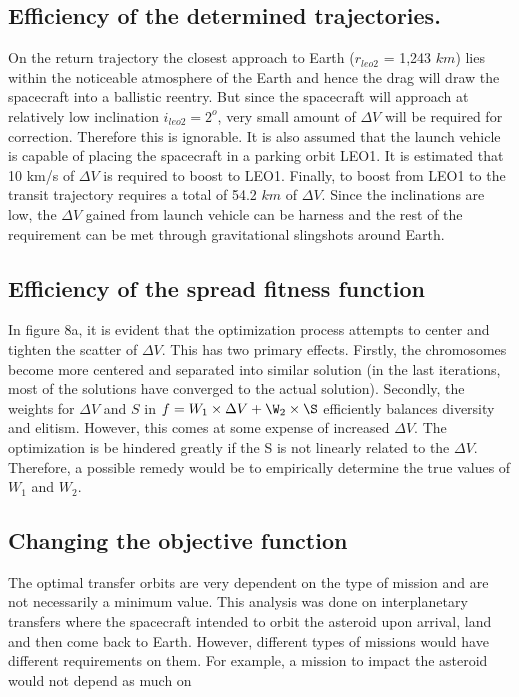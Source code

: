 \documentclass[11pt,a4paper]{article}
\begin{document}
\begin{multicols}{2}
\subsection{Efficiency of the determined trajectories.}
On the return trajectory the closest approach to Earth ($r_{leo2}$ = 1,243 $km$) lies within the noticeable atmosphere of the Earth and hence the drag will draw the spacecraft into a ballistic reentry. But since the spacecraft will approach at relatively low inclination $i_{leo2}=2^o$, very small amount of $\Delta V$ will be required for correction. Therefore this is ignorable. It is also assumed that the launch vehicle is capable of placing the spacecraft in a parking orbit LEO1. It is estimated that 10 km/s of $\Delta V$ is required to boost to LEO1. Finally, to boost from LEO1 to the transit trajectory requires a total of 54.2 $km$ of $\Delta V$. Since the inclinations are low, the $\Delta V$ gained from launch vehicle can be harness and the rest of the requirement can be met through gravitational slingshots around Earth. 

\subsection{Efficiency of the spread fitness function}

In figure 8a, it is evident that the optimization process attempts to center and tighten the scatter of $\Delta V$. This has two primary effects. Firstly, the chromosomes become more centered and separated into similar solution (in the last iterations, most of the solutions have converged to the actual solution). Secondly, the weights for $\Delta V$ and $S$ in $f=W_1\times\Delta V+\W_2\times\S$ efficiently balances diversity and elitism. However, this comes at some expense of increased $\Delta V$. The optimization is be hindered greatly if the S is not linearly related to the $\Delta V$. Therefore, a possible remedy would be to empirically determine the true values of $W_1$ and $W_2$.

\subsection{Changing the objective function}
The optimal transfer orbits are very dependent on the type of mission and are not necessarily a minimum value. This analysis was done on interplanetary transfers where the spacecraft intended to orbit the asteroid upon arrival, land and then come back to Earth. However, different types of missions would have different requirements on them. For example, a mission to impact the asteroid would not depend as much on \end{multicols}
\end{document}
